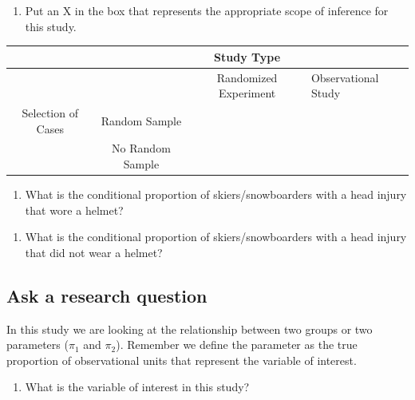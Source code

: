 \documentclass[
]{report}
\providecommand{\tightlist}{%
  \setlength{\itemsep}{0pt}\setlength{\parskip}{0pt}}
\begin{document}
\vspace{0.3in}

\begin{enumerate}
\def\labelenumi{\arabic{enumi}.}
\setcounter{enumi}{3}
\tightlist
\item
  Put an X in the box that represents the appropriate scope of inference for this study.
\end{enumerate}

\begin{longtable}[]{@{}cccl@{}}
\toprule
& & Study Type &\tabularnewline
\midrule
\endhead
& & Randomized Experiment & Observational Study\tabularnewline
Selection of Cases & Random Sample & &\tabularnewline
& No Random Sample & &\tabularnewline
\bottomrule
\end{longtable}

\begin{enumerate}
\def\labelenumi{\arabic{enumi}.}
\setcounter{enumi}{4}
\tightlist
\item
  What is the conditional proportion of skiers/snowboarders with a head injury that wore a helmet?
\end{enumerate}

\vspace{.6in}

\begin{enumerate}
\def\labelenumi{\arabic{enumi}.}
\setcounter{enumi}{5}
\tightlist
\item
  What is the conditional proportion of skiers/snowboarders with a head injury that did not wear a helmet?
\end{enumerate}

\vspace{.6in}

\hypertarget{ask-a-research-question}{%
\subsection{Ask a research question}\label{ask-a-research-question}}

In this study we are looking at the relationship between two groups or two parameters (\(\pi_1\) and \(\pi_2\)). Remember we define the parameter as the true proportion of observational units that represent the variable of interest.

\begin{enumerate}
\def\labelenumi{\arabic{enumi}.}
\setcounter{enumi}{6}
\tightlist
\item
  What is the variable of interest in this study?
\end{enumerate}
\end{document}
